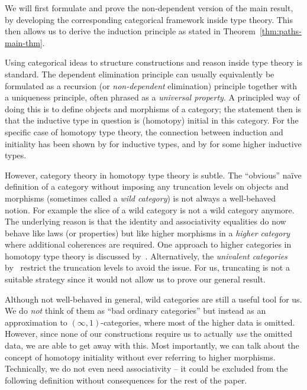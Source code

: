 We will first formulate and prove the non-dependent version of the main result,
by developing the corresponding categorical framework inside type theory.
This then allows us to derive the induction principle as stated in Theorem~\ref{thm:paths-main-thm}.

Using categorical ideas to structure constructions and reason inside type
theory is standard.
The dependent elimination principle can usually equivalently be formulated
as a recursion (or \emph{non-dependent} elimination) principle together
with a uniqueness principle,
often phrased as a \emph{universal property}.
A principled way of doing this is to define objects and morphisms of a
category; the statement then is that the inductive type in question is
(homotopy) initial in this category.
For the specific case of homotopy type theory, the connection between
induction and initiality has been shown by
\cite{awodeyGamSoja_hoAlgs} for inductive types,
and by \cite{DBLP:journals/corr/Sojakova14} for some higher inductive types.

However, category theory in homotopy type theory is subtle.
The ``obvious'' naïve definition of a category without imposing any
truncation levels on objects and morphisms (sometimes called a
\emph{wild category}) is not always a well-behaved notion.
For example the slice of a wild category is not a wild category anymore.
The underlying reason is that the identity and associativity
equalities do now behave like laws (or properties) but like higher morphisms
in a \emph{higher category} where additional coherences are required.
One approach to higher categories in homotopy type theory
is discussed by~\cite{Capriotti2017}.
Alternatively, the \emph{univalent categories} by~\cite{ahrens_rezk}
restrict the truncation levels to avoid the issue.
For us,
truncating is not a suitable strategy since it would not allow us to prove our general result.

Although not well-behaved in general, wild categories are still a useful tool
for us.
We do \emph{not} think of them as ``bad ordinary categories'' but instead
as an approximation to $(\infty,1)$-categories, where most of the
higher data is omitted.
However, since none of our constructions require us to actually \emph{use}
the omitted data, we are able to get away with this.
Most importantly,
we can talk about the concept of homotopy initiality without ever referring
to higher morphisms.
Technically, we do not even need associativity -- it could be excluded from the
following definition without consequences for the rest of the paper.

